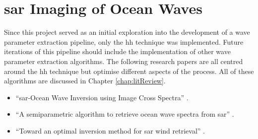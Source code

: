 \section{\acs{sar} Imaging of Ocean Waves} \label{sec:rec.hh}
Since this project served as an initial exploration into the development of a wave parameter extraction pipeline, only the \acs{hh} technique was implemented. Future iterations of this pipeline should include the implementation of other wave parameter extraction algorithms. The following research papers are all centred around the \acs{hh} technique but optimise different aspects of the process. All of these algorithms are discussed in Chapter \ref{chap:litReview}.

\begin{itemize}
    \item “\acs{sar}-Ocean Wave Inversion using Image Cross Spectra” \cite{Engen1995}.
    \item “A semiparametric algorithm to retrieve ocean wave spectra from \acs{sar}” \cite{Mastenbroek2000}.
    \item “Toward an optimal inversion method for \acs{sar} wind retrieval” \cite{Portabella2002}.
\end{itemize}





